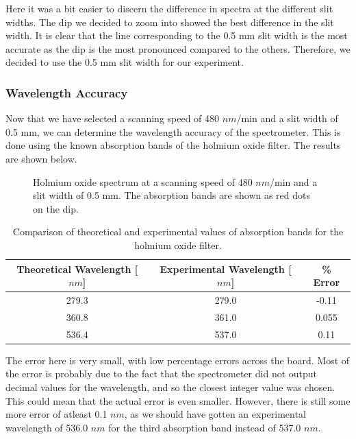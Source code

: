 \documentclass{article}
\begin{document}
Here it was a bit easier to discern the difference in spectra at the different slit widths. The dip we decided to zoom into showed the best difference in the slit width. It is clear that the line corresponding to the 0.5 mm slit width is the most accurate as the dip is the most pronounced compared to the others. Therefore, we decided to use the 0.5 mm slit width for our experiment.

\subsubsection{Wavelength Accuracy}

Now that we have selected a scanning speed of 480 $nm$/min and a slit width of 0.5 mm, we can determine the wavelength accuracy of the spectrometer. This is done using the known absorption bands of the holmium oxide filter. The results are shown below.

\begin{figure}[h!]
	\centering
	\scalebox{0.70}{}
	\caption{Holmium oxide spectrum at a scanning speed of 480 $nm$/min and a slit width of 0.5 mm. The absorption bands are shown as red dots on the dip.}
	\label{fig:WavelengthAccuracy}
\end{figure}

\begin{table}[h!]
	\centering
	\begin{tabular}{|c|c|c|}
	\hline
	Theoretical Wavelength {[}$nm${]} & Experimental Wavelength {[}$nm${]} & \% Error \\ \hline
	279.3                           & 279.0                            & -0.11    \\ \hline
	360.8                           & 361.0                            & 0.055    \\ \hline
	536.4                           & 537.0                            & 0.11     \\ \hline
	\end{tabular}%
	\caption{Comparison of theoretical and experimental values of absorption bands for the holmium oxide filter.}
	\label{tab:WavelengthAccuracy}
\end{table}

The error here is very small, with low percentage errors across the board. Most of the error is probably due to the fact that the spectrometer did not output decimal values for the wavelength, and so the closest integer value was chosen. This could mean that the actual error is even smaller. However, there is still some more error of atleast 0.1 $nm$, as we should have gotten an experimental wavelength of 536.0 $nm$ for the third absorption band instead of 537.0 $nm$. 
\end{document}
